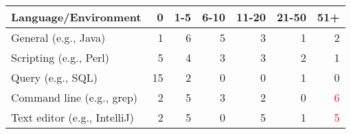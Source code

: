 \begin{adjustbox}{width=\textwidth}
\begin{tabular}{l | r @{  } r @{  } r @{  } r @{  } r @{  } r }
\toprule
\textbf{Language/Environment} & \textbf{0} & \textbf{1-5} & \textbf{6-10} & \textbf{11-20} & \textbf{21-50} & \textbf{51+} \\  \midrule
General  (e.g., Java)  & 1 & 6 & 5 & 3& 1& 2 \\ \midrule
Scripting  (e.g., Perl) &5 &4 &3 &3 &2  &1 \\ \midrule
Query  (e.g., SQL) & 15&2 &0 &0 &1  & 0\\ \midrule
Command line (e.g., grep)   &2 &5 &3 &2 &0  &\textcolor{red}{6} \\ \midrule
Text editor (e.g., IntelliJ)   & 2& 5& 0& 5& 1& \textcolor{red}{5}\\
\bottomrule
\end{tabular}
\end{adjustbox}
